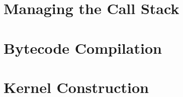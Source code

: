 \documentclass[10pt,twoside,english,showtrims]{support/latex/sbabook/sbabook}
\begin{document}
\frontmatter
\pagestyle{plain}

\tableofcontents*
\clearpage\listoffigures

\mainmatter

\part{Managing the Call Stack}


\part{Bytecode Compilation}


\part{Kernel Construction}


\backmatter

\end{document}
